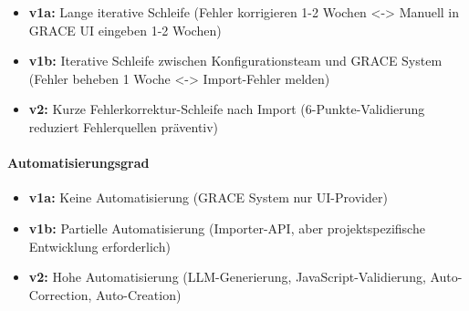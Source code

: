 \begin{itemize}
    \item \textbf{v1a:} Lange iterative Schleife (\glqq Fehler korrigieren\grqq{} 1-2 Wochen <-> \glqq Manuell in GRACE UI eingeben\grqq{} 1-2 Wochen)
    \item \textbf{v1b:} Iterative Schleife zwischen Konfigurationsteam und GRACE System (\glqq Fehler beheben\grqq{} 1 Woche <-> \glqq Import-Fehler melden\grqq{})
    \item \textbf{v2:} Kurze Fehlerkorrektur-Schleife nach Import (6-Punkte-Validierung reduziert Fehlerquellen präventiv)
\end{itemize}

\paragraph{Automatisierungsgrad}

\begin{itemize}
    \item \textbf{v1a:} Keine Automatisierung (GRACE System nur UI-Provider)
    \item \textbf{v1b:} Partielle Automatisierung (Importer-API, aber projektspezifische Entwicklung erforderlich)
    \item \textbf{v2:} Hohe Automatisierung (LLM-Generierung, JavaScript-Validierung, Auto-Correction, Auto-Creation)
\end{itemize}

